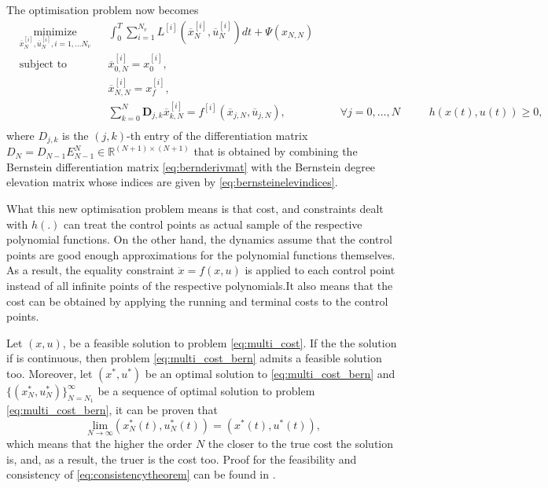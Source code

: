 \par The optimisation problem now becomes 
\begin{equation}
    \label{eq:multi_cost_bern}
    \begin{aligned}
    & \underset{\overline{x}_N^{[i]},\overline{u}_N^{[i]},i= 1,\dots N_v}{\text{minimize}} && \int_0^T \sum_{i=1}^{N_v}  L^{[i]} (\overline{x}_N^{[i]},\overline{u}_N^{[i]})dt + \Psi (x_{N,N}) \\
    & \text{subject to}  && \overline{x}^{[i]}_{0,N} = x_0^{[i]}, \\
        & && \overline{x}^{[i]}_{N,N} = x_f^{[i]}, \\
        & && \sum_{k=0}^{N} \boldsymbol{D}_{j,k} \overline{x}_{k,N}^{[i]} = f^{[i]} (\overline{x}_{j,N},\overline{u}_{j,N}), &&& \forall j=0,\dots,N\
        & && h(x(t),u(t)) \geq 0, \\
    \end{aligned}
\end{equation}
where $D_{j,k}$ is the $(j,k)$-th entry of the differentiation matrix $D_N = D_{N-1}E^N_{N-1}\in \mathbb{R}^{(N+1)\times(N+1)}$ that is obtained by combining the Bernstein differentiation matrix \eqref{eq:bernderivmat} with the Bernstein degree elevation matrix whose indices are given by \eqref{eq:bernsteinelevindices}.
\par What this new optimisation problem means is that cost, and constraints dealt with $h(.)$ can treat the control points as actual sample of the respective polynomial functions. On the other hand, the dynamics assume that the control points are good enough approximations for the polynomial functions themselves. As a result, the equality constraint $\dot{x}=f(x,u)$ is applied to each control point instead of all infinite points of the respective polynomials.It also means that the cost can be obtained by applying the running and terminal costs to the control points.
\par Let $(x,u)$, be a feasible solution to problem \ref{eq:multi_cost}. If the the solution if is continuous, then problem \ref{eq:multi_cost_bern} admits a feasible solution too. Moreover, let $(x^*,u^*)$ be an optimal solution to \ref{eq:multi_cost_bern} and $\{(x_N^*,u_N^*)\}^\infty_{N=N_1}$ be a sequence of optimal solution to problem \ref{eq:multi_cost_bern}, it can be proven that 
\begin{equation}
    \underset{N\rightarrow\infty}{\text{lim}} (x^*_N(t),u^*_N(t)) = (x^*(t),u^*(t)),
    \label{eq:consistencytheorem}
\end{equation}
which means that the higher the order $N$ the closer to the true cost the solution is, and, as a result, the truer is the cost too. Proof for the feasibility and consistency of \eqref{eq:consistencytheorem} can be found in \cite{cichella2018bernstein}.


